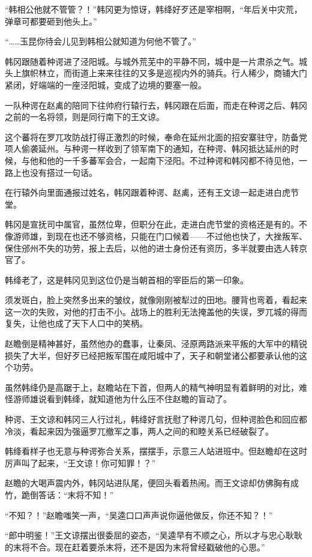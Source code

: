 “韩相公他就不管管？！”韩冈更为惊讶，韩绛好歹还是宰相啊，“年后关中灾荒，弹章可都要砸到他头上。”

“……玉昆你待会儿见到韩相公就知道为何他不管了。”

韩冈跟随着种谔进了泾阳城。与城外荒芜中的平静不同，城中是一片肃杀之气。城头上旗帜林立，而街道上来来往往的又多是巡视内外的骑兵。行人稀少，商铺大门紧闭，好端端的一座泾阳城，变成了边境的要塞一般。

一队种谔在赵禼的陪同下往帅府行辕行去，韩冈跟在后面，而走在种谔之后、韩冈之前的一名将领，则是同行南下的王文谅。

这个蕃将在罗兀攻防战打得正激烈的时候，奉命在延州北面的招安寨驻守，防备党项人偷袭延州。与种谔一样收到了领军南下的通知，在种谔、韩冈抵达延州的时候，与他和他的一千多蕃军会合，一起南下泾阳。不过种谔和韩冈都不待见他，一路上也没有搭过一句话。

在行辕外向里面通报过姓名，韩冈跟着种谔、赵禼，还有王文谅一起走进白虎节堂。

韩冈是宣抚司中属官，虽然位卑，但职分在此，走进白虎节堂的资格还是有的。不像游师雄，到现在也还不够资格，只能在门口候着——不过他也快了，大挫叛军、保住邠州不失的功劳，报上去后，以他的进士身份还有资历，多半就要由选人转京官了。

韩绛老了，这是韩冈见到这位仍是当朝首相的宰臣后的第一印象。

须发斑白，脸上突然多出来的皱纹，就像刚刚被犁过的田地。腰背也弯着，看起来这一次的失败，对他的打击不小。战场上的胜利无法掩盖他的失误，罗兀城的得而复失，让他也成了天下人口中的笑柄。

赵瞻倒是精神甚好，虽然他办的蠢事，让秦凤、泾原两路派来平叛的大军中的精锐损失了大半，但好歹已经把叛军围在咸阳城中了，天子和朝堂诸公都要承认他的这个功劳。

虽然韩绛仍是高踞于上，赵瞻站在下首，但两人的精气神明显有着鲜明的对比，难怪游师雄说看到韩绛，就知道他为什么压不住赵瞻的盲动了。

种谔、王文谅和韩冈三人行过礼，韩绛好言抚慰了种谔几句，但种谔脸色和回应都冷淡，看起来因为强逼罗兀撤军之事，两人之间的和睦关系已经破裂了。

韩绛看样子也无意与种谔弥合关系，摆摆手，示意三人站进班中。但赵瞻却在这时厉声叫了起来，“王文谅！你可知罪！？”

赵瞻的大喝声震内外，韩冈站进队尾，便回头看着热闹。而王文谅却仿佛胸有成竹，跪倒答话：“末将不知！”

“不知？！”赵瞻嗤笑一声，“吴逵口口声声说你逼他做反，你还不知？！”

“郎中明鉴！”王文谅摆出很委屈的姿态，“吴逵早有不顺之心，所以才与忠心耿耿的末将不合。现在赶着要杀末将，还不是因为末将曾经戳破他的心思。”

